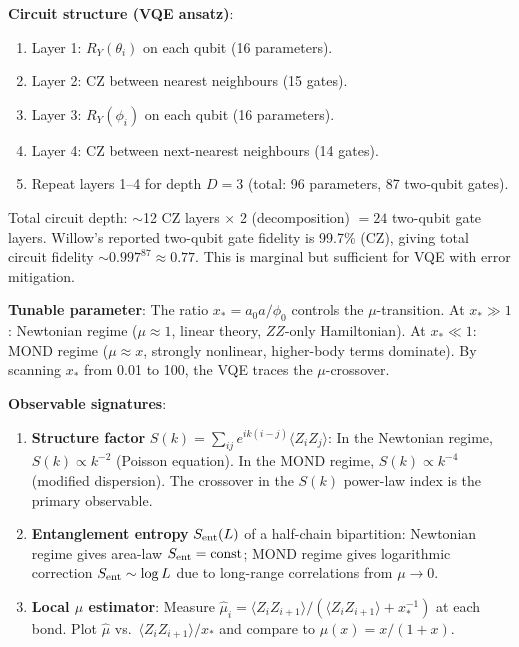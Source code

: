 \documentclass[11pt]{article}
\theoremstyle{definition}
\theoremstyle{remark}
\begin{document}
\begin{tcolorbox}[colback=blue!5!white, colframe=blue!60!black,
  title=\textbf{W4i17 TOP 5 FINDINGS --- READ FIRST}]
\begin{enumerate}[nosep]
  \textbf{Circuit structure (VQE ansatz)}:
  \begin{enumerate}[nosep]
    \item Layer 1: $R_Y(\theta_i)$ on each qubit (16 parameters).
    \item Layer 2: CZ between nearest neighbours (15 gates).
    \item Layer 3: $R_Y(\phi_i)$ on each qubit (16 parameters).
    \item Layer 4: CZ between next-nearest neighbours (14 gates).
    \item Repeat layers 1--4 for depth $D = 3$ (total: 96 parameters,
      87 two-qubit gates).
  \end{enumerate}
  Total circuit depth: $\sim$12 CZ layers $\times$ 2 (decomposition)
  $= 24$ two-qubit gate layers. Willow's reported two-qubit gate
  fidelity is 99.7\% (CZ), giving total circuit fidelity
  $\sim 0.997^{87} \approx 0.77$. This is marginal but sufficient
  for VQE with error mitigation.

  \textbf{Tunable parameter}: The ratio $x_* = a_0 a / \phi_0$ controls
  the $\mu$-transition. At $x_* \gg 1$: Newtonian regime ($\mu \approx 1$,
  linear theory, $ZZ$-only Hamiltonian). At $x_* \ll 1$: MOND regime
  ($\mu \approx x$, strongly nonlinear, higher-body terms dominate).
  By scanning $x_*$ from 0.01 to 100, the VQE traces the $\mu$-crossover.

  \textbf{Observable signatures}:
  \begin{enumerate}[nosep]
    \item \textbf{Structure factor} $S(k) = \sum_{ij} e^{ik(i-j)}
      \langle Z_i Z_j \rangle$: In the Newtonian regime, $S(k) \propto
      k^{-2}$ (Poisson equation). In the MOND regime, $S(k) \propto
      k^{-4}$ (modified dispersion). The crossover in the $S(k)$
      power-law index is the primary observable.
    \item \textbf{Entanglement entropy} $S_{\rm ent}(L)$ of a
      half-chain bipartition: Newtonian regime gives area-law
      $S_{\rm ent} = {\rm const}$; MOND regime gives logarithmic
      correction $S_{\rm ent} \sim \log L$ due to long-range
      correlations from $\mu \to 0$.
    \item \textbf{Local $\mu$ estimator}: Measure
      $\hat\mu_i = \langle Z_i Z_{i+1}\rangle / (\langle Z_i Z_{i+1}
      \rangle + x_*^{-1})$ at each bond. Plot $\hat\mu$ vs.\
      $\langle Z_i Z_{i+1}\rangle / x_*$ and compare to
      $\mu(x) = x/(1+x)$.
  \end{enumerate}


\end{enumerate}
\end{tcolorbox}
\end{document}
